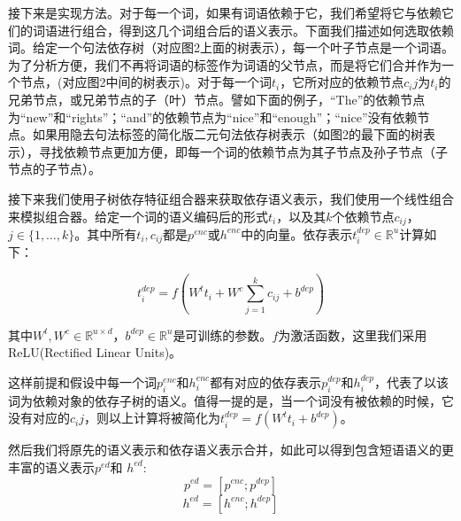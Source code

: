 \documentclass[UTF8,11pt,a4paper,nofonts]{ctexart}
\begin{document}
接下来是实现方法。对于每一个词，如果有词语依赖于它，我们希望将它与依赖它们的词语进行组合，得到这几个词组合后的语义表示。下面我们描述如何选取依赖词。给定一个句法依存树（对应图2上面的树表示），每一个叶子节点是一个词语。为了分析方便，我们不再将词语的标签作为词语的父节点，而是将它们合并作为一个节点，(对应图2中间的树表示)。对于每一个词$t_i$，它所对应的依赖节点$c_ij$为$t_i$的兄弟节点，或兄弟节点的子（叶）节点。譬如下面的例子，“The”的依赖节点为“new”和“rights”；“and”的依赖节点为“nice”和“enough”；“nice”没有依赖节点。如果用隐去句法标签的简化版二元句法依存树表示（如图2的最下面的树表示），寻找依赖节点更加方便，即每一个词的依赖节点为其子节点及孙子节点（子节点的子节点）。



接下来我们使用子树依存特征组合器来获取依存语义表示，我们使用一个线性组合来模拟组合器。给定一个词的语义编码后的形式$t_{i}$，以及其$k$个依赖节点$c_{ij}$，$j \in \{1,\dots,k\}$。其中所有$t_{i}, c_{ij}$都是$p^{enc}$或$h^{enc}$中的向量。依存表示$t^{dep}_i \in \mathbb{R}^u$计算如下：

\begin{equation}
t^{dep}_i = f(W^t t_i + W^c  \sum^{k}_{j=1}c_{ij} + b^{dep})
\end{equation}

其中$W^t, W^c \in \mathbb{R}^{u \times d}$，$b^{dep} \in \mathbb{R}^{u}$是可训练的参数。$f$为激活函数，这里我们采用ReLU(Rectified Linear Units)。

这样前提和假设中每一个词$p^{enc}_i$和$h^{enc}_i$都有对应的依存表示$p^{dep}_i$和$h^{dep}_i$，代表了以该词为依赖对象的依存子树的语义。值得一提的是，当一个词没有被依赖的时候，它没有对应的$c_ij$，则以上计算将被简化为$t^{dep}_i = f(W^t t_i + b^{dep})$。

然后我们将原先的语义表示和依存语义表示合并，如此可以得到包含短语语义的更丰富的语义表示$p^{ed}$和 $h^{ed}$:
\begin{equation}
p^{ed} = [p^{enc}; p^{dep}]
\end{equation}
\begin{equation}
h^{ed} = [h^{enc}; h^{dep}]
\end{equation}
\end{document}
